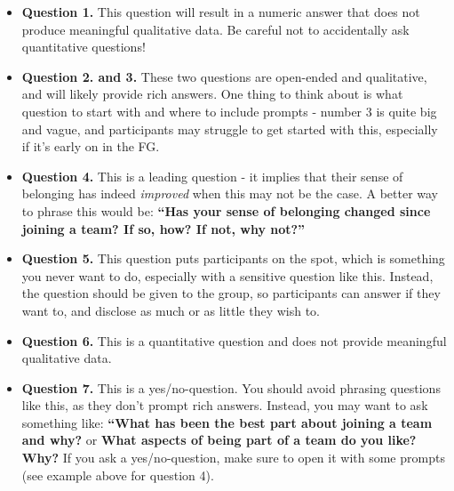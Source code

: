 \documentclass[
  english,
  letterpaper,
  DIV=11,
  numbers=noendperiod]{scrreprt}
\providecommand{\tightlist}{%
  \setlength{\itemsep}{0pt}\setlength{\parskip}{0pt}}
\begin{document}
\begin{tcolorbox}[enhanced jigsaw, breakable, bottomtitle=1mm, leftrule=.75mm, opacityback=0, colbacktitle=quarto-callout-caution-color!10!white, opacitybacktitle=0.6, toprule=.15mm, colback=white, left=2mm, coltitle=black, bottomrule=.15mm, titlerule=0mm, title={Suggested Answers}, toptitle=1mm, colframe=quarto-callout-caution-color-frame, arc=.35mm, rightrule=.15mm]

\begin{itemize}
\tightlist
\item
  \textbf{Question 1.} This question will result in a numeric answer
  that does not produce meaningful qualitative data. Be careful not to
  accidentally ask quantitative questions!
\item
  \textbf{Question 2. and 3.} These two questions are open-ended and
  qualitative, and will likely provide rich answers. One thing to think
  about is what question to start with and where to include prompts -
  number 3 is quite big and vague, and participants may struggle to get
  started with this, especially if it's early on in the FG.
\item
  \textbf{Question 4.} This is a leading question - it implies that
  their sense of belonging has indeed \emph{improved} when this may not
  be the case. A better way to phrase this would be: \textbf{``Has your
  sense of belonging changed since joining a team? If so, how? If not,
  why not?''}
\item
  \textbf{Question 5.} This question puts participants on the spot,
  which is something you never want to do, especially with a sensitive
  question like this. Instead, the question should be given to the
  group, so participants can answer if they want to, and disclose as
  much or as little they wish to.
\item
  \textbf{Question 6.} This is a quantitative question and does not
  provide meaningful qualitative data.
\item
  \textbf{Question 7.} This is a yes/no-question. You should avoid
  phrasing questions like this, as they don't prompt rich answers.
  Instead, you may want to ask something like: \textbf{``What has been
  the best part about joining a team and why?} or \textbf{What aspects
  of being part of a team do you like? Why?} If you ask a
  yes/no-question, make sure to open it with some prompts (see example
  above for question 4).
\end{itemize}

\end{tcolorbox}
\end{document}
